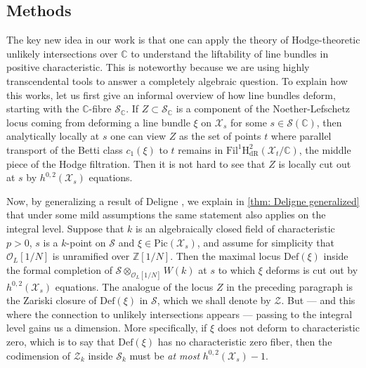 \documentclass[letter, 11pt]{article}
\theoremstyle{plain}
\theoremstyle{definition}
\newcommand{\IC}{\mathbb{C}}
\newcommand{\IZ}{\mathbb{Z}}
\newcommand\tensor{{\otimes}}
\newcommand{\<}{\langle}
\renewcommand{\>}{\rangle}
\newcommand{\sX}{\mathcal{X}}
\newcommand{\sS}{\mathcal{S}}
\newcommand{\sE}{\mathcal{E}}
\newcommand{\sO}{\mathcal{O}}
\newcommand{\sZ}{\mathcal{Z}}
\newcommand{\Pic}{\mathrm{Pic}}
\newcommand{\Fil}{\mathrm{Fil}}
\renewcommand{\H}{\mathrm{H}}
\newcommand{\Def}{\mathrm{Def}}
\newcommand{\dR}{\mathrm{dR}}
\begin{document}




\subsection{Methods}
\label{sec: methods}
The key new idea in our work is that one can apply the theory of Hodge-theoretic unlikely intersections over $\IC$ to understand the liftability of line bundles in positive characteristic. This is noteworthy because we are using highly transcendental tools to answer a completely algebraic question. To explain how this works, let us first give an informal overview of how line bundles deform, starting with the $\IC$-fibre $\sS_{\IC}$. If $Z \subset \sS_{\IC}$ is a component of the Noether-Lefschetz locus coming from deforming a line bundle $\xi$ on $\sX_s$ for some $s \in \sS(\IC)$, then analytically locally at $s$ one can view $Z$ as the set of points $t$ where parallel transport of the Betti class $c_1(\xi)$ to $t$ remains in $\Fil^{1} \H^2_\dR(\sX_{t}/\IC)$, the middle piece of the Hodge filtration. Then it is not hard to see that $Z$ is locally cut out at $s$ by $h^{0, 2}(\sX_s)$ equations.

Now, by generalizing a result of Deligne \cite[Prop.~1.5]{Del02}, we explain in \ref{thm: Deligne generalized} that under some mild assumptions the same statement also applies on the integral level. Suppose that $k$ is an algebraically closed field of characteristic $p > 0$, $s$ is a $k$-point on $\sS$ and $\xi \in \Pic(\sX_s)$, and assume for simplicity that $\sO_L[1/N]$ is unramified over $\IZ[1/N]$. Then the maximal locus $\Def(\xi)$ inside the formal completion of $\sS \tensor_{\sO_L[1/N]} W(k)$ at $s$ to which $\xi$ deforms is cut out by $h^{0, 2}(\sX_s)$ equations. The analogue of the locus $Z$ in the preceding paragraph is the Zariski closure of $\Def(\xi)$ in $\sS$, which we shall denote by $\mathcal{Z}$. But --- and this where the connection to unlikely intersections appears --- passing to the integral level gains us a dimension. More specifically, if $\xi$ does not deform to characteristic zero, which is to say that $\Def(\xi)$ has no characteristic zero fiber, then the codimension of $\sZ_{k}$ inside $\sS_{k}$ must be \emph{at most} $h^{0, 2}(\sX_s) - 1$.
\end{document}
